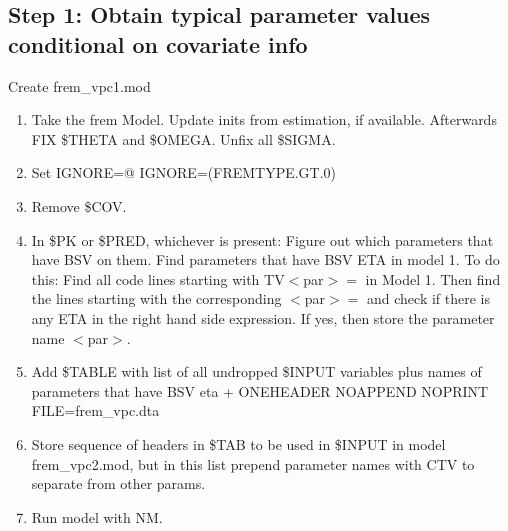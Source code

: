 \subsection{Step 1: Obtain typical parameter values conditional on covariate info}
Create frem\_vpc1.mod

\begin{enumerate}
	\item Take the frem Model. Update inits from estimation, if available. Afterwards FIX \$THETA and \$OMEGA. Unfix all \$SIGMA.
	\item Set IGNORE=@ IGNORE=(FREMTYPE.GT.0)
	\item Remove \$COV.
	\item In \$PK or \$PRED, whichever is present:
Figure out which parameters that have BSV %
on them.
Find parameters
that have BSV ETA %
in model 1.
To do this: Find all code lines starting with TV$<$par$>=$ in Model 1. Then find the lines starting with the corresponding $<$par$>=$ and
check if there is any ETA in the right hand side expression. If yes, then store the parameter name $<$par$>$.
	\item Add \$TABLE with list of all undropped \$INPUT variables plus names of parameters that have BSV eta  + ONEHEADER NOAPPEND NOPRINT FILE=frem\_vpc.dta
	\item Store sequence of headers in \$TAB to be used in \$INPUT in model frem\_vpc2.mod, but in this list prepend parameter names with CTV to separate from other params.
	\item Run model with NM.
\end{enumerate}


